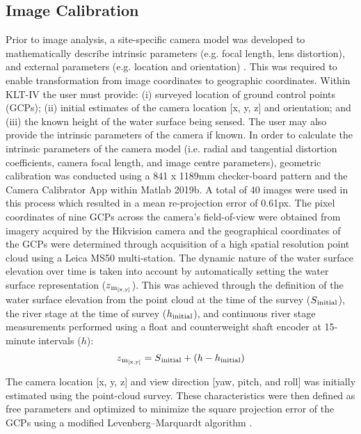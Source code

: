 \documentclass[hess, manuscript]{copernicus} %
\begin{document}
\subsection{Image Calibration}\label{Image Calibration}
Prior to image analysis, a site-specific camera model was developed to mathematically describe intrinsic parameters (e.g. focal length, lens distortion), and external parameters (e.g. location and orientation) \citep{Messerli2015, Perks2016}. This was required to enable transformation from image coordinates to geographic coordinates. Within KLT-IV the user must provide: (i) surveyed location of ground control points (GCPs); (ii) initial estimates of the camera location [x, y, z] and orientation; and (iii) the known height of the water surface being sensed. The user may also provide the intrinsic parameters of the camera if known. In order to calculate the intrinsic parameters of the camera model (i.e. radial and tangential distortion coefficients, camera focal length, and image centre parameters), geometric calibration was conducted using a 841 x 1189mm checker-board pattern and the Camera Calibrator App within Matlab 2019b. A total of 40 images were used in this process which resulted in a mean re-projection error of 0.61px. The pixel coordinates of nine GCPs across the camera's field-of-view were obtained from imagery acquired by the Hikvision camera and the geographical coordinates of the GCPs were determined through acquisition of a high spatial resolution point cloud using a Leica MS50 multi-station. The dynamic nature of the water surface elevation over time is taken into account by automatically setting the water surface representation ($z\textsubscript{m\textsubscript{[x,y]}}$). This was achieved through the definition of the water surface elevation from the point cloud at the time of the survey ($S\textsubscript{initial}$), the river stage at the time of survey ($h\textsubscript{initial}$), and continuous river stage measurements performed using a float and counterweight shaft encoder at 15-minute intervals ($h$):
\begin{equation}
 z\textsubscript{m\textsubscript{[x,y]}} = S\textsubscript{initial} + (h - h\textsubscript{initial})
\label{eqn: Equation 1}
\end{equation}

The camera location [x, y, z] and view direction [yaw, pitch, and roll] was initially estimated using the point-cloud survey. These characteristics were then defined as free parameters and optimized to minimize the square projection error of the GCPs using a modified Levenberg–Marquardt algorithm \citep{Fletcher1971, Messerli2015}.
\end{document}
